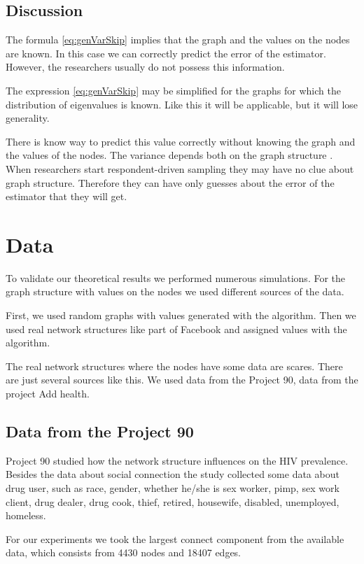 \documentclass[12pt]{report}
\begin{document}
\subsection{Discussion}

The formula \ref{eq:genVarSkip} implies that the graph and the values on the nodes are known. In this case we can correctly predict the error of the estimator. However, the researchers usually do not possess this information.

The expression \ref{eq:genVarSkip} may be simplified for the graphs for which the distribution of eigenvalues is known. Like this it will be applicable, but it will lose generality.

There is know way to predict this value correctly without knowing the graph and the values of the nodes. The variance depends both on the graph structure . When researchers start respondent-driven sampling they may have no clue about graph structure. Therefore they can have only guesses about the error of the estimator that they will get.


\section{Data}

To validate our theoretical results we performed numerous simulations. For the graph structure with values on the nodes we used different sources of the data. 

First, we used random graphs with values generated with the algorithm. 
Then we used real network structures like part of Facebook \cite{Facebook}  and assigned values with the algorithm.

The real network structures where the nodes have some data are scares. There are just several sources like this. We used data from the Project 90\cite{Project90}, data from the project Add health\cite{Addhealth}. 

\subsection{Data from the Project 90}
Project 90 \cite{Project90} studied how the network structure influences on the HIV prevalence. Besides the data about social connection the study collected some data about drug user, such as race, gender, whether he/she is sex worker, pimp, sex work client, drug dealer, drug cook, thief, retired, housewife, disabled, unemployed, homeless.


For our experiments we took the largest connect component from the available data, which consists from 4430 nodes and 18407 edges.
\end{document}
